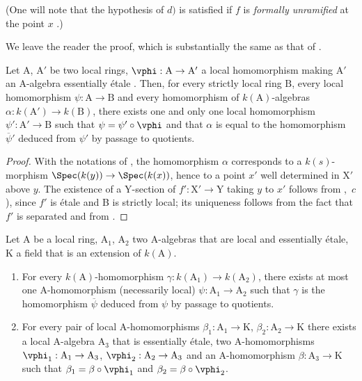 (One will note that the hypothesis of $d)$ is satisfied if $f$ is \emph{formally unramified} at the point $x$ .)

We leave the reader the proof, which is substantially the same as that of .

\begin{lemma}[18.8.4]
\label{IV.18.8.4}
Let $\mathrm{A}$, $\mathrm{A}'$ be two local rings, $\vphi:\mathrm{A}\to\mathrm{A}'$ a local homomorphism making $\mathrm{A}'$ an A-algebra essentially \'{e}tale .
Then, for every strictly local ring $\mathrm{B}$, every local homomorphism $\psi:\mathrm{A}\to\mathrm{B}$ and every homomorphism of $k(\mathrm{A})$-algebras $\alpha:k(\mathrm{A}')\to k(\mathrm{B})$, there exists one and only one local homomorphism $\psi':\mathrm{A}'\to\mathrm{B}$ such that $\psi=\psi'\circ\vphi$ and that $\alpha$ is equal to the homomorphism $\overline{\psi}'$ deduced from $\psi'$ by passage to quotients.
\end{lemma}

\begin{proof}
With the notations of , the homomorphism $\alpha$ corresponds to a $k(s)$-morphism $\Spec(k(y))\to\Spec(k(x))$, hence to a point $x'$ well determined in $\mathrm{X}'$ above $y$.
The existence of a Y-section of $f':\mathrm{X}'\to\mathrm{Y}$ taking $y$ to $x'$ follows from ,~$c$), since $f'$ is \'{e}tale and B is strictly local; its uniqueness follows from the fact that $f'$ is separated and from .
\end{proof}

\begin{lemma}[18.8.5]
\label{IV.18.8.5}
Let $\mathrm{A}$ be a local ring, $\mathrm{A}_1$, $\mathrm{A}_2$ two A-algebras that are local and essentially \'{e}tale, K a field that is an extension of $k(\mathrm{A})$.
\begin{enumerate}[label=\emph{\roman*)}]
  \item For every $k(\mathrm{A})$-homomorphism $\gamma:k(\mathrm{A}_1)\to k(\mathrm{A}_2)$, there exists at most one A-homomorphism (necessarily local) $\psi:\mathrm{A}_1\to\mathrm{A}_2$ such that $\gamma$ is the homomorphism $\overline{\psi}$ deduced from $\psi$ by passage to quotients.
  \item For every pair of local A-homomorphisms $\beta_1:\mathrm{A}_1\to\mathrm{K}$, $\beta_2:\mathrm{A}_2\to\mathrm{K}$ there exists a local A-algebra $\mathrm{A}_3$ that is essentially \'{e}tale, two A-homomorphisms $\vphi_1:\mathrm{A}_1\to\mathrm{A}_3$, $\vphi_2:\mathrm{A}_2\to\mathrm{A}_3$ and an A-homomorphism $\beta:\mathrm{A}_3\to\mathrm{K}$ such that $\beta_1=\beta\circ\vphi_1$ and $\beta_2=\beta\circ\vphi_2$.
\end{enumerate}
\end{lemma}

